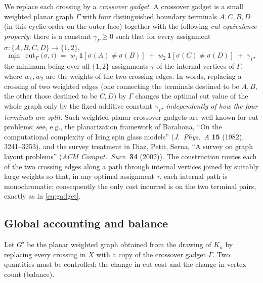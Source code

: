 \documentclass{amsart}
\theoremstyle{plain}
\theoremstyle{definition}
\theoremstyle{remark}
\newcommand{\cut}{\operatorname{cut}}
\begin{document}
We replace each crossing by a \emph{crossover gadget}. A crossover gadget is a small
weighted planar graph $\Gamma$ with four distinguished boundary terminals
$A,C,B,D$ (in this cyclic order on the outer face) together with the following
\emph{cut-equivalence property}: there is a constant $\gamma_\Gamma\ge 0$ such that for
every assignment $\sigma\colon\{A,B,C,D\}\to\{1,2\}$,
\begin{equation}\label{eq:gadget}
  \min_{\tau}\ \cut_{\Gamma}\bigl(\sigma,\tau\bigr)
  \;=\; w_1\,\mathbf 1[\sigma(A)\ne\sigma(B)]
   \;+\; w_2\,\mathbf 1[\sigma(C)\ne\sigma(D)] \;+\; \gamma_\Gamma,
\end{equation}
the minimum being over all $\{1,2\}$-assignments $\tau$ of the internal vertices of
$\Gamma$, where $w_1,w_2$ are the weights of the two crossing edges. In words, replacing
a crossing of two weighted edges (one connecting the terminals destined to be $A,B$, the
other those destined to be $C,D$) by $\Gamma$ changes the optimal cut value of the whole
graph only by the fixed additive constant $\gamma_\Gamma$, \emph{independently of how the
four terminals are split}. Such weighted planar crossover gadgets are well known for cut
problems; see, e.g., the planarization framework of Barahona,
``On the computational complexity of Ising spin glass models''
(\emph{J.\ Phys.\ A} \textbf{15} (1982), 3241--3253), and the survey treatment in
Diaz, Petit, Serna, ``A survey on graph layout problems'' (\emph{ACM Comput.\ Surv.}
\textbf{34} (2002)). The construction routes each of the two crossing edges along a path
through internal vertices joined by suitably large weights so that, in any optimal
assignment $\tau$, each internal path is monochromatic; consequently the only cost
incurred is on the two terminal pairs, exactly as in \eqref{eq:gadget}.

\subsection{Global accounting and balance}\label{sec:balance}

Let $G^{\flat}$ be the planar weighted graph obtained from the drawing of $K_n$ by
replacing every crossing in $X$ with a copy of the crossover gadget $\Gamma$. Two
quantities must be controlled: the change in cut cost and the change in vertex count
(balance).
\end{document}
